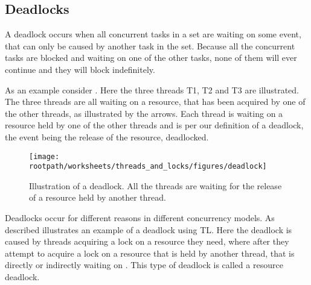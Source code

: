\subsection{Deadlocks}
A deadlock occurs when all concurrent tasks in a set are waiting on some event, that can only be caused by another task in the set\cite[p. 435]{tanenbaum2008modern}. Because all the concurrent tasks are blocked and waiting on one of the other tasks, none of them will ever continue and they will block indefinitely.

As an example consider . Here the three threads T1, T2 and T3 are illustrated. The three threads are all waiting on a resource, that has been acquired by one of the other threads, as illustrated by the arrows. Each thread is waiting on a resource held by one of the other threads and is per our definition of a deadlock, the event being the release of the resource, deadlocked.
\begin{figure}[htbp]
\centering
 \texttt{[image: \\rootpath/worksheets/threads\_and\_locks/figures/deadlock]} 
 \caption{Illustration of a deadlock. All the threads are waiting for the release of a resource held by another thread.}
\label{fig:deadlockexample}
\end{figure}

Deadlocks occur for different reasons in different concurrency models. As described  illustrates an example of a deadlock using \ac{TL}. Here the deadlock is caused by threads acquiring a lock on a resource they need, where after they attempt to acquire a lock on a resource that is held by another thread, that is directly or indirectly waiting on . This type of deadlock is called a resource deadlock\cite[p. 435]{tanenbaum2008modern}. 


